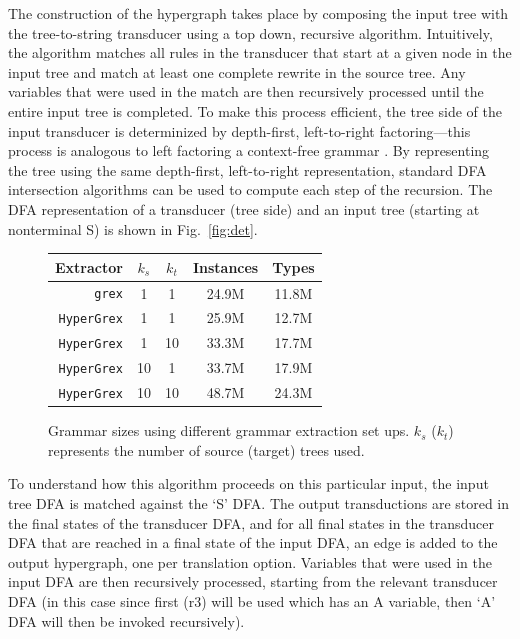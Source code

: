 \documentclass[nofonts]{pbml} %
\begin{document}
The construction of the hypergraph takes place by composing the input tree with the tree-to-string transducer using a top down, recursive algorithm. Intuitively, the algorithm matches all rules in the transducer that start at a given node in the input tree and match at least one complete rewrite in the source tree. Any variables that were used in the match are then recursively processed until the entire input tree is completed. To make this process efficient, the tree side of the input transducer is determinized by depth-first, left-to-right factoring---this process is analogous to left factoring a context-free grammar \citep{klein:2001}. By representing the tree using the same depth-first, left-to-right representation, standard DFA intersection algorithms can be used to compute each step of the recursion. The DFA representation of a transducer (tree side) and an input tree (starting at nonterminal S) is shown in Fig.~\ref{fig:det}.

\begin{figure}
\centering
\begin{tabular}{r c c c c}
Extractor & $k_s$ & $k_t$ & Instances & Types \\
\hline
\texttt{grex}      &  1 &  1 & 24.9M & 11.8M \\
\texttt{HyperGrex} &  1 &  1 & 25.9M & 12.7M \\
\texttt{HyperGrex} &  1 & 10 & 33.3M & 17.7M \\
\texttt{HyperGrex} & 10 &  1 & 33.7M & 17.9M \\
\texttt{HyperGrex} & 10 & 10 & 48.7M & 24.3M \\
\end{tabular}
\caption{Grammar sizes using different grammar extraction set ups.
$k_s$ ($k_t$) represents the number of source (target) trees used.}
\label{grammarsizes}
\end{figure}

To understand how this algorithm proceeds on this particular input, the input tree DFA is matched against the `S' DFA. The output transductions are stored in the final states of the transducer DFA, and for all final states in the transducer DFA that are reached in a final state of the input DFA, an edge is added to the output hypergraph, one per translation option. Variables that were used in the input DFA are then recursively processed, starting from the relevant transducer DFA (in this case since first (r3) will be used which has an A variable, then `A' DFA will then be invoked recursively).
\end{document}
